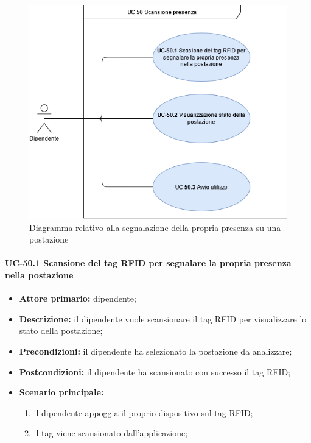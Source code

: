     \begin{figure}[H]
		\centering
		  \includegraphics[scale=0.50]{src/CasiDUso/immagini/ScansionePresenza.png}
		\caption{Diagramma relativo alla segnalazione della propria presenza su una postazione}
	\end{figure}


\paragraph{UC-50.1 Scansione del tag RFID per segnalare la propria presenza nella postazione}
   
    \begin{itemize}
        \item \textbf{Attore primario:} dipendente;

        \item \textbf{Descrizione:} il dipendente vuole scansionare il tag RFID per visualizzare lo stato della postazione;

        \item \textbf{Precondizioni:} il dipendente ha selezionato la postazione da analizzare;

        \item \textbf{Postcondizioni:} il dipendente ha scansionato con successo il tag RFID;

        \item \textbf{Scenario principale:}
            \begin{enumerate}
                \item il dipendente appoggia il proprio dispositivo sul tag RFID;
                \item il tag viene scansionato dall'applicazione;
            \end{enumerate}
    \end{itemize}

